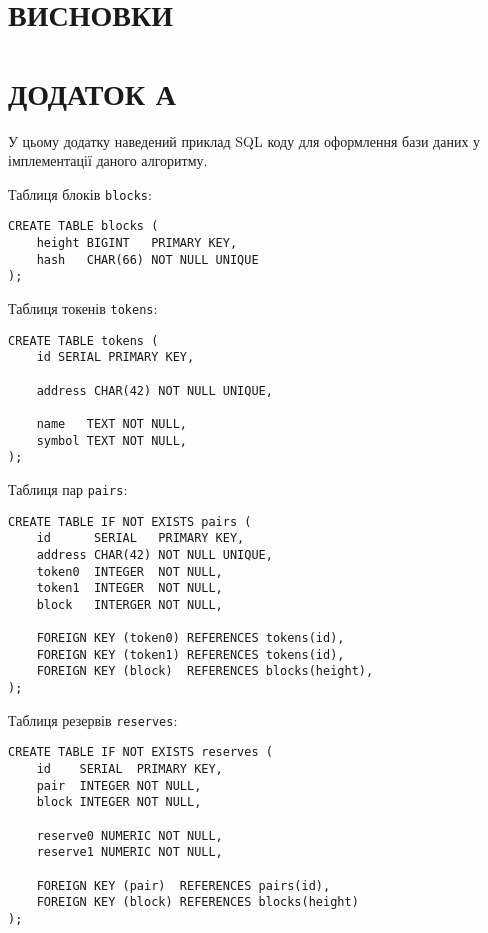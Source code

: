 \documentclass[14pt]{extarticle}
\begin{document}
\newpage

\section{ВИСНОВКИ}

\newpage

\printbibliography{}
\newpage

\section*{ДОДАТОК А}\label{sec:addition-a}

У цьому додатку наведений приклад SQL коду для оформлення бази даних у
імплементації даного алгоритму.

Таблиця блоків \texttt{blocks}:

\begin{verbatim}
CREATE TABLE blocks (
    height BIGINT   PRIMARY KEY,
    hash   CHAR(66) NOT NULL UNIQUE
);
\end{verbatim}

Таблиця токенів \texttt{tokens}:

\begin{verbatim}
CREATE TABLE tokens (
    id SERIAL PRIMARY KEY,

    address CHAR(42) NOT NULL UNIQUE,

    name   TEXT NOT NULL,
    symbol TEXT NOT NULL,
);
\end{verbatim}

Таблиця пар \texttt{pairs}:

\begin{verbatim}
CREATE TABLE IF NOT EXISTS pairs (
    id      SERIAL   PRIMARY KEY,
    address CHAR(42) NOT NULL UNIQUE,
    token0  INTEGER  NOT NULL,
    token1  INTEGER  NOT NULL,
    block 	INTERGER NOT NULL,

    FOREIGN KEY (token0) REFERENCES tokens(id),
    FOREIGN KEY (token1) REFERENCES tokens(id),
    FOREIGN KEY (block)  REFERENCES blocks(height),
);
\end{verbatim}

Таблиця резервів \texttt{reserves}:

\begin{verbatim}
CREATE TABLE IF NOT EXISTS reserves (
    id    SERIAL  PRIMARY KEY,
    pair  INTEGER NOT NULL,
    block INTEGER NOT NULL,

    reserve0 NUMERIC NOT NULL,
    reserve1 NUMERIC NOT NULL,

    FOREIGN KEY (pair)  REFERENCES pairs(id),
    FOREIGN KEY (block) REFERENCES blocks(height)
);
\end{verbatim}
\end{document}
